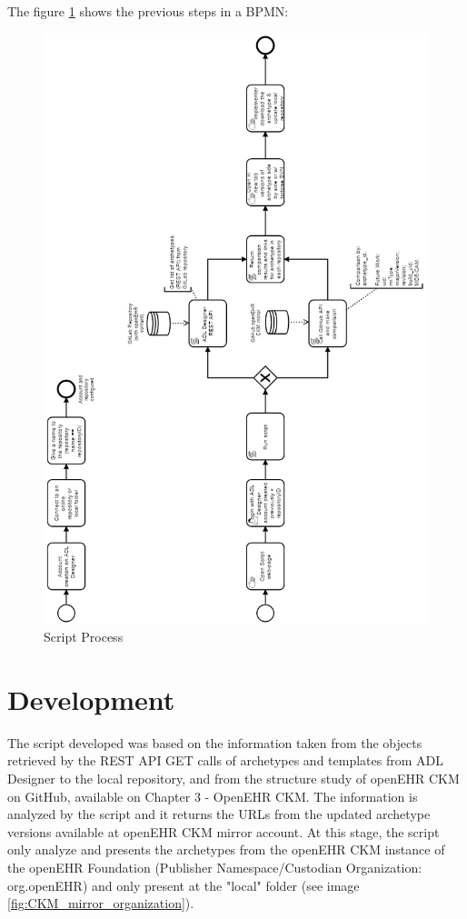 \documentclass[mim_thesis.tex]{subfiles}
\begin{document}
 The figure \ref{fig:script_process} shows the previous steps in a \ac{BPMN}:
 
\begin{figure}[H]
	\centering
    \includegraphics[width=1.07\textwidth]{img/script_process.PNG}
	\caption{Script Process}
	\label{fig:script_process}
\end{figure}

\section{Development}
The script developed was based on the information taken from the objects retrieved by the REST API GET calls of archetypes and templates from ADL Designer to the local repository, and from the structure study of openEHR CKM on GitHub, available on Chapter 3 - OpenEHR CKM. The information is analyzed by the script and it returns the URLs from the updated archetype versions available at openEHR CKM mirror account. At this stage, the script only analyze and presents the archetypes from the openEHR CKM instance of the openEHR Foundation (Publisher Namespace/Custodian Organization: org.openEHR) and only present at the "local" folder (see image \ref{fig:CKM_mirror_organization}).
\end{document}
